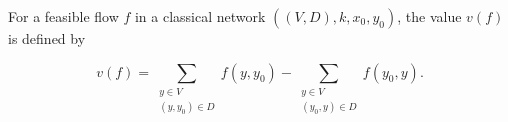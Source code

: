 For a feasible flow $f$ in a classical network $((V, D), k, x_0, y_0)$, the value $v(f)$ is defined by

$$v(f) = \sum_{\substack{y \in V \\ (y, y_0) \in D}} f(y, y_0) - \sum_{\substack{y \in V \\ (y_0, y) \in D}} f(y_0, y).$$

